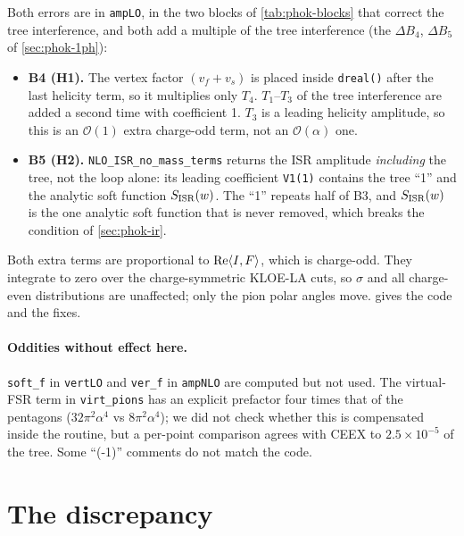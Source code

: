 \documentclass[11pt,a4paper]{article}
\newcommand{\code}[1]{\texttt{#1}}
\newcommand{\ceex}{CEEX}
\begin{document}
Both errors are in \code{ampLO}, in the two blocks of \cref{tab:phok-blocks} that correct the
tree interference, and both add a multiple of the tree interference (the $\Delta B_4$, $\Delta B_5$
of \cref{sec:phok-1ph}):
\begin{itemize}
\item \textbf{B4 (H1).} The vertex factor $(v_f+v_s)$ is placed inside \code{dreal()} after the
  last helicity term, so it multiplies only $T_4$. $T_1$--$T_3$ of the tree interference are
  added a second time with coefficient 1. $T_3$ is a leading helicity amplitude, so this is an
  $\mathcal O(1)$ extra charge-odd term, not an $\mathcal O(\alpha)$ one.
\item \textbf{B5 (H2).} \code{NLO\_ISR\_no\_mass\_terms} returns the ISR amplitude
  \emph{including} the tree, not the loop alone: its leading coefficient \code{V1(1)} contains
  the tree ``1'' and the analytic soft function $S_{\rm ISR}(w)$. The ``1'' repeats half of B3,
  and $S_{\rm ISR}(w)$ is the one analytic soft function that is never removed, which breaks
  the condition of \cref{sec:phok-ir}.
\end{itemize}
Both extra terms are proportional to ${\rm Re}\langle I,F\rangle$, which is charge-odd. They
integrate to zero over the charge-symmetric KLOE-LA cuts, so $\sigma$ and all charge-even
distributions are unaffected; only the pion polar angles move.  gives the code and
the fixes.

\paragraph{Oddities without effect here.} \code{soft\_f} in \code{vertLO} and \code{ver\_f} in
\code{ampNLO} are computed but not used. The virtual-FSR term in \code{virt\_pions} has an
explicit prefactor four times that of the pentagons ($32\pi^2\alpha^4$ vs $8\pi^2\alpha^4$); we
did not check whether this is compensated inside the routine, but a per-point comparison
agrees with \ceex{} to $2.5\times10^{-5}$ of the tree. Some ``(-1)'' comments do
not match the code.

\section{The discrepancy}
\label{sec:discrepancy}
\end{document}

